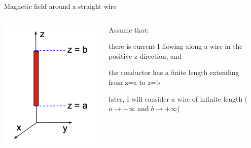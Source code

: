 %
%
%

\begin{frame}{Magnetic field around a straight wire}

\begin{columns}
  \begin{column}{0.40\textwidth}
    \includegraphics[width=0.98\textwidth]{./images/schematics/magnetic_field_around_wire_calc_01.png}
  \end{column}
  \begin{column}{0.60\textwidth}
  {\small
   Assume that:
   \begin{itemize}
   {\small
      \item there is current I flowing along a wire in the positive z direction, and
      \item the conductor has a finite length extending from z=a to z=b
        \begin{itemize}
        {\small
             \item later, I will consider a wire of infinite length
                       ($a \rightarrow -\infty$ and $b \rightarrow +\infty$)
}
\end{itemize}}
\end{itemize}}
\end{column}
\end{columns}
\end{frame}
